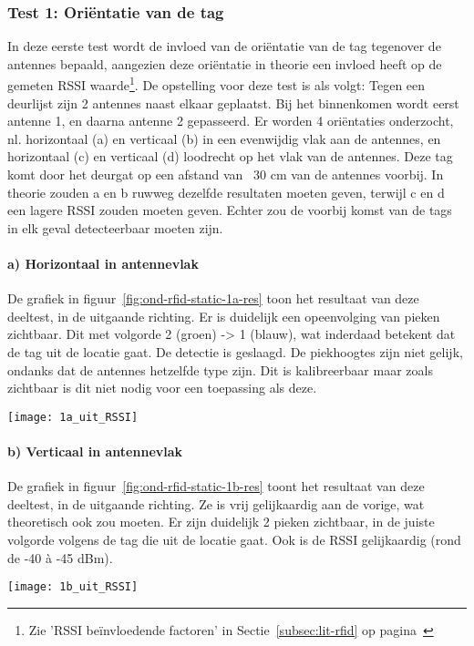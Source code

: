\subsubsection{Test 1: Oriëntatie van de tag}
\label{sec:ond-rfid-2-1}
In deze eerste test wordt de invloed van de oriëntatie van de tag tegenover de antennes bepaald, aangezien deze oriëntatie in theorie een invloed heeft op de gemeten RSSI waarde\footnote{Zie 'RSSI beïnvloedende factoren' in Sectie~\ref{subsec:lit-rfid} op pagina~\pageref{subsec:lit-rfid}}. De opstelling voor deze test is als volgt: Tegen een deurlijst zijn 2 antennes naast elkaar geplaatst. Bij het binnenkomen wordt eerst antenne 1, en daarna antenne 2 gepasseerd. Er worden 4 oriëntaties onderzocht, nl. horizontaal (a) en verticaal (b) in een evenwijdig vlak aan de antennes, en horizontaal (c) en verticaal (d) loodrecht op het vlak van de antennes. Deze tag komt door het deurgat op een afstand van ~30 cm van de antennes voorbij.
In theorie zouden a en b ruwweg dezelfde resultaten moeten geven, terwijl c en d een lagere RSSI zouden moeten geven. Echter zou de voorbij komst van de tags in elk geval detecteerbaar moeten zijn.

\paragraph{a) Horizontaal in antennevlak}
\begin{minipage}{0.55\textwidth}
De grafiek in figuur~\ref{fig:ond-rfid-static-1a-res} toon het resultaat van deze deeltest, in de uitgaande richting. Er is duidelijk een opeenvolging van pieken zichtbaar. Dit met volgorde 2 (groen) -> 1 (blauw), wat inderdaad betekent dat de tag uit de locatie gaat. De detectie is geslaagd. De piekhoogtes zijn niet gelijk, ondanks dat de antennes hetzelfde type zijn. Dit is kalibreerbaar maar zoals zichtbaar is dit niet nodig voor een toepassing als deze.
\end{minipage}
\hfill
\begin{minipage}{0.42\textwidth}
	\texttt{[image: 1a\_uit\_RSSI]}
	\label{fig:ond-rfid-static-1a-res}
\end{minipage}

\paragraph{b) Verticaal in antennevlak}
\begin{minipage}{0.55\textwidth}
De grafiek in figuur~\ref{fig:ond-rfid-static-1b-res} toont het resultaat van deze deeltest, in de uitgaande richting. Ze is vrij gelijkaardig aan de vorige, wat theoretisch ook zou moeten. Er zijn duidelijk 2 pieken zichtbaar, in de juiste volgorde volgens de tag die uit de locatie gaat. Ook is de RSSI gelijkaardig (rond de -40 à -45 dBm).
\end{minipage}
\hfill
\begin{minipage}{0.42\textwidth}
	\texttt{[image: 1b\_uit\_RSSI]}
	\label{fig:ond-rfid-static-1b-res}
\end{minipage}

